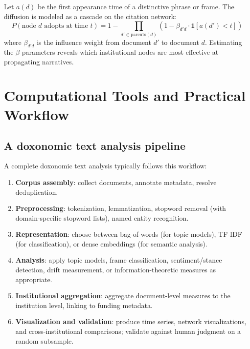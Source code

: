 \begin{model}
\label{mod:narrative-diffusion}
Let $a(d)$ be the first appearance time of a distinctive phrase or frame.
The diffusion is modeled as a cascade on the citation network:
\[
  P(\text{node } d \text{ adopts at time } t) = 1 - \prod_{d' \in \text{parents}(d)} (1 - \beta_{d'd} \cdot \mathbf{1}[a(d') < t])
\]
where $\beta_{d'd}$ is the influence weight from document $d'$ to document $d$.
Estimating the $\beta$ parameters reveals which institutional nodes are most effective at propagating narratives.
\end{model}

\section{Computational Tools and Practical Workflow}
\label{sec:ch17-tools}

\subsection{A doxonomic text analysis pipeline}

A complete doxonomic text analysis typically follows this workflow:

\begin{enumerate}
  \item \textbf{Corpus assembly}: collect documents, annotate metadata, resolve deduplication.
  \item \textbf{Preprocessing}: tokenization, lemmatization, stopword removal (with domain-specific stopword lists), named entity recognition.
  \item \textbf{Representation}: choose between bag-of-words (for topic models), TF-IDF (for classification), or dense embeddings (for semantic analysis).
  \item \textbf{Analysis}: apply topic models, frame classification, sentiment/stance detection, drift measurement, or information-theoretic measures as appropriate.
  \item \textbf{Institutional aggregation}: aggregate document-level measures to the institution level, linking to funding metadata.
  \item \textbf{Visualization and validation}: produce time series, network visualizations, and cross-institutional comparisons; validate against human judgment on a random subsample.
\end{enumerate}

